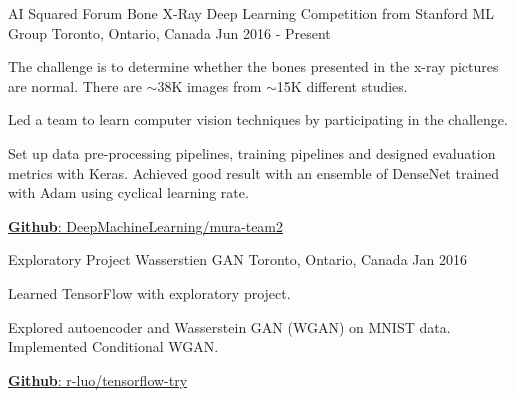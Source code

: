 
\begin{cventries}

  \cventry
    {AI Squared Forum} %
    {Bone X-Ray Deep Learning Competition from Stanford ML Group} %
    {Toronto, Ontario, Canada} %
    {Jun 2016 - Present} %
    {
      \begin{cvitems} %
        \item {The challenge is to determine whether the bones presented in the x-ray pictures are normal. There are $\sim$38K images from $\sim$15K different studies.}
        \item {Led a team to learn computer vision techniques by participating in the challenge.}
        \item {Set up data pre-processing pipelines, training pipelines and designed evaluation metrics with Keras. Achieved good result with an ensemble of DenseNet trained with Adam using cyclical learning rate.}
        \item \href{https://github.com/DeepMachineLearning/mura-team2}{\textbf{Github}: DeepMachineLearning/mura-team2}
      \end{cvitems}
    }

\end{cventries}

\begin{cventries}

  \cventry
    {Exploratory Project} %
    {Wasserstien GAN} %
    {Toronto, Ontario, Canada} %
    {Jan 2016} %
    {
      \begin{cvitems} %
        \item {Learned TensorFlow with exploratory project.}
        \item {Explored autoencoder and Wasserstein GAN (WGAN) on MNIST data. Implemented Conditional WGAN.}
        \item \href{https://github.com/r-luo/tensorflow-try}{\textbf{Github}: r-luo/tensorflow-try}
      \end{cvitems}
    }

\end{cventries}

